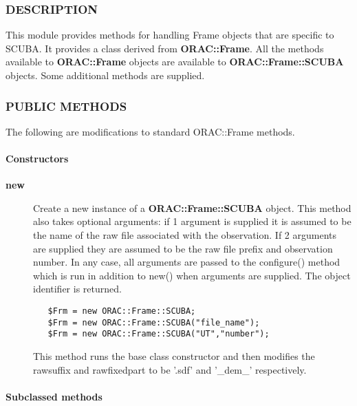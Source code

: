 \begin{description}
\begin{description}
\subsubsection*{DESCRIPTION\label{ORAC::Frame::SCUBA_DESCRIPTION}}


This module provides methods for handling Frame objects that
are specific to SCUBA. It provides a class derived from \textbf{ORAC::Frame}.
All the methods available to \textbf{ORAC::Frame} objects are available
to \textbf{ORAC::Frame::SCUBA} objects. Some additional methods are supplied.

\subsubsection*{PUBLIC METHODS\label{ORAC::Frame::SCUBA_PUBLIC_METHODS}}


The following are modifications to standard ORAC::Frame methods.

\paragraph*{Constructors\label{ORAC::Frame::SCUBA_Constructors}}
\begin{description}

\item[{\textbf{new}}] \mbox{}

Create a new instance of a \textbf{ORAC::Frame::SCUBA} object.
This method also takes optional arguments:
if 1 argument is  supplied it is assumed to be the name
of the raw file associated with the observation. If 2 arguments
are supplied they are assumed to be the raw file prefix and
observation number. In any case, all arguments are passed to
the configure() method which is run in addition to new()
when arguments are supplied.
The object identifier is returned.

\begin{verbatim}
   $Frm = new ORAC::Frame::SCUBA;
   $Frm = new ORAC::Frame::SCUBA("file_name");
   $Frm = new ORAC::Frame::SCUBA("UT","number");
\end{verbatim}


This method runs the base class constructor and then modifies
the rawsuffix and rawfixedpart to be '.sdf' and '\_dem\_'
respectively.

\end{description}
\paragraph*{Subclassed methods\label{ORAC::Frame::SCUBA_Subclassed_methods}}



\end{description}
\end{description}

